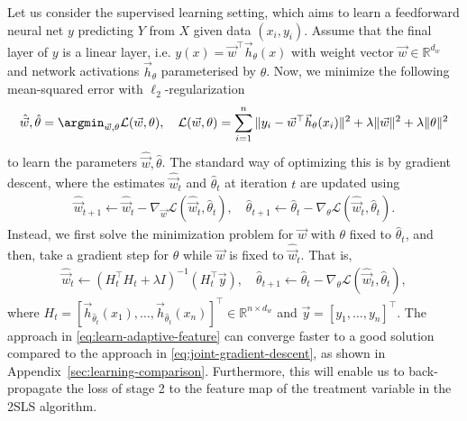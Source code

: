 Let us consider the supervised learning setting, which aims to learn a feedforward neural net $y$ predicting $Y$ from $X$ given data ${(x_i, y_i)}$. Assume that the final layer of $y$ is a linear layer, i.e. $y(x) = \vec{w}^\top \vec{h}_\theta(x)$ with weight vector $\vec{w} \in \mathbb{R}^{d_w}$ and network activations $\vec{h}_\theta$ parameterised by $\theta$. Now, we minimize the following mean-squared error with $\ell_2$-regularization
\begin{align*}
    \hat{\vec{w}}, \hat{\theta} = \argmin_{\vec{w}, \theta} \mathcal{L}(\vec{w}, \theta), \quad \mathcal{L}(\vec{w}, \theta)= \sum_{i=1}^n \|y_i - \vec{w}^\top \vec{h}_\theta(x_i)\|^2 + \lambda\|\vec{w}\|^2 + \lambda\|\theta\|^2 
\end{align*}
to learn the parameters $\hat{\vec{w}}, \hat{\theta}$. The standard way of optimizing this is by gradient descent, where the estimates $\hat{\vec{w}}_t$ and $\hat{\theta}_t$ at iteration $t$
are updated using
\begin{align}
    \hat{\vec{w}}_{t+1} \leftarrow \hat{\vec{w}}_{t} - \nabla_{\vec{w}}  \mathcal{L}(\hat{\vec{w}}_{t}, \hat{\theta}_t), \quad \hat{\theta}_{t+1} \leftarrow \hat{\theta}_{t} - \nabla_{\theta}  \mathcal{L}(\hat{\vec{w}}_t, \hat{\theta}_{t}). \label{eq:joint-gradient-descent}
\end{align}
Instead, we first solve the minimization problem for $\vec{w}$ with $\theta$ fixed to $\hat{\theta}_t$, and then, take a gradient step for $\theta$ while $\vec{w}$ is fixed to $\hat{\vec{w}}_t$. That is,
\begin{align}
    \hat{\vec{w}}_{t} \leftarrow \left(H_t^\top H_t + \lambda I\right)^{-1}\left(H_t^\top \vec{y}\right), \quad 
    \hat{\theta}_{t+1} \leftarrow \hat{\theta}_{t} - \nabla_{\theta}\mathcal{L}(\hat{\vec{w}}_{t}, \hat{\theta}_{t}), \label{eq:learn-adaptive-feature}
\end{align}
where $H_t = [\vec{h}_{\hat{\theta}_t}(x_1), \dots, \vec{h}_{\hat{\theta}_t}(x_n)]^\top \in \mathbb{R}^{n\times d_w}$ and  $\vec{y} = [y_1, \dots, y_n]^\top$.
The approach in \eqref{eq:learn-adaptive-feature} can converge faster to a good solution compared to the approach in \eqref{eq:joint-gradient-descent}, as shown in Appendix~\ref{sec:learning-comparison}. Furthermore, this will enable us to back-propagate the loss of stage 2 to the feature map of the treatment variable in the 2SLS algorithm.


